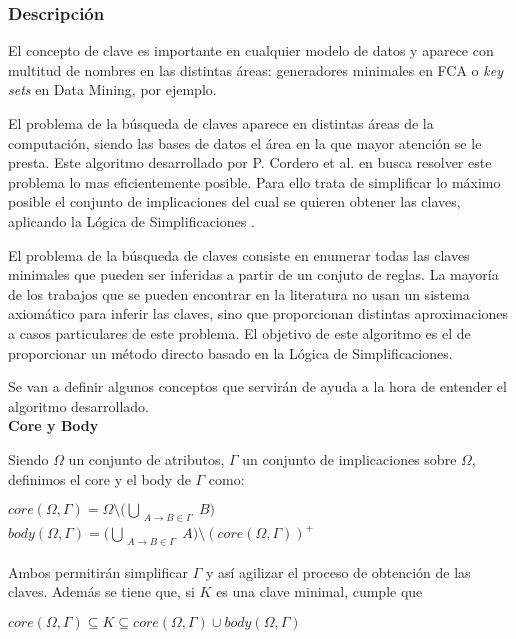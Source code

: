 \subsubsection{Descripci\'on} 

El concepto de clave es importante en cualquier modelo de datos y aparece con multitud de nombres en las distintas \'areas: generadores minimales en FCA o \textit{key sets} en Data Mining, por ejemplo.

El problema de la b\'usqueda de claves aparece en distintas \'areas de la computaci\'on, siendo las bases de datos el \'area en la que mayor atenci\'on se le presta. Este algoritmo desarrollado por P. Cordero et al. en  \cite{Reduction} busca resolver este problema lo mas eficientemente posible. Para ello trata de simplificar lo m\'aximo posible el conjunto de implicaciones del cual se quieren obtener las claves, aplicando la L\'ogica de Simplificaciones \cite{Cordero2002}.

El problema de la b\'usqueda de claves consiste en enumerar todas las claves minimales que pueden ser inferidas a partir de un conjuto de reglas. La mayor\'ia de los trabajos que se pueden encontrar en la literatura no usan un sistema axiom\'atico para inferir las claves, sino que proporcionan distintas aproximaciones a casos particulares de este problema. El objetivo de este algoritmo es el de proporcionar un m\'etodo directo basado en la L\'ogica de Simplificaciones.

Se van a definir algunos conceptos que servir\'an de ayuda a la hora de entender el algoritmo desarrollado.\\

\textbf{Core y Body}

Siendo \(\Omega\) un conjunto de atributos, \(\Gamma\) un conjunto de implicaciones sobre \(\Omega\), definimos el core y el body de \(\Gamma\) como:
\begin{center}
    \(core(\Omega,\Gamma) = \Omega \setminus \big(\bigcup_{\substack{A \to B \in \Gamma}} B\big) \ \ \ \ \)
    \(body(\Omega,\Gamma) = \big(\bigcup_{\substack{A \to B \in \Gamma}} A\big) \setminus (core(\Omega,\Gamma))^+\)
\end{center}
Ambos permitir\'an simplificar \(\Gamma\) y as\'i agilizar el proceso de obtenci\'on de las claves. Adem\'as se tiene que, si \(K\) es una clave minimal, cumple que 
\begin{center}
    \(core(\Omega,\Gamma) \subseteq K \subseteq core(\Omega,\Gamma) \cup body(\Omega,\Gamma)\)
\end{center}
\newpage
